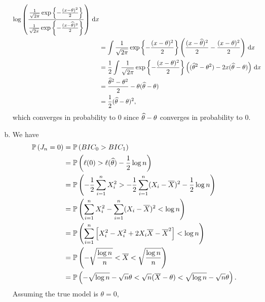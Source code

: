 \begin{ex}
\begin{enumerate}[(a)]
\begin{align*}
            \log\left(\frac{\frac{1}{\sqrt{2\pi}}\exp\left\{-\frac{(x-\theta)^2}{2}\right\}}{\frac{1}{\sqrt{2\pi}}\exp\left\{-\frac{(x-\widehat{\theta})^2}{2} \right\}}\right)\,\mathrm{d}{x} \\
             & =\int \frac{1}{\sqrt{2\pi}}\exp\left\{-\frac{(x-\theta)^2}{2}\right\}
            \left(\frac{(x-\widehat{\theta})^2}{2}-\frac{(x-\theta)^2}{2}\right)\,\mathrm{d}{x}                                                                                                \\
             & =\frac{1}{2}\int \frac{1}{\sqrt{2\pi}}\exp\left\{-\frac{(x-\theta)^2}{2}\right\}
            \left((\widehat{\theta}^2-\theta^2)-2x(\widehat{\theta}-\theta)\right)\,\mathrm{d}{x}                                                                                                     \\
             & =\frac{\widehat{\theta}^2-\theta^2}{2}-\theta(\widehat{\theta}-\theta)                                                                                                         \\\
             & =\frac{1}{2}(\widehat{\theta}-\theta)^2,
          \end{align*}
          which converges in probability to $0$ since $\widehat{\theta}-\theta$
          converges in probability to $0$.
    \item We have
          \begin{align*}
            \mathbb{P}\left(J_n=0\right)
             & =\mathbb{P}\left(BIC_0 > BIC_1\right)                                                                            \\
             & =\mathbb{P}\left(\ell(0) > \ell(\widehat{\theta})-\frac{1}{2}\log{n}\right)                                             \\
             & =\mathbb{P}\left(-\frac{1}{2}\sum_{i=1}^nX_i^2 > -\frac{1}{2}\sum_{i=1}^n(X_i-\overline{X})^2-\frac{1}{2}\log{n}\right) \\
             & =\mathbb{P}\left(\sum_{i=1}^nX_i^2-\sum_{i=1}^n(X_i-\overline{X})^2 < \log{n}\right)                                    \\
             & =\mathbb{P}\left(\sum_{i=1}^n\left[X_i^2-X_i^2+2X_i\overline{X}-\overline{X}^2 \right] < \log{n}\right)                        \\
             & =\mathbb{P}\left(-\sqrt{\frac{\log{n}}{n}}<\overline{X} < \sqrt{\frac{\log{n}}{n}}\right)                               \\
             & =\mathbb{P}\left(-\sqrt{\log{n}}-\sqrt{n}\theta <\sqrt{n}(\overline{X}-\theta) < \sqrt{\log{n}}-\sqrt{n}\theta\right).
          \end{align*}
          Assuming the true model is $\theta=0$,
          \begin{align*}

\end{align*}
\end{enumerate}
\end{ex}
